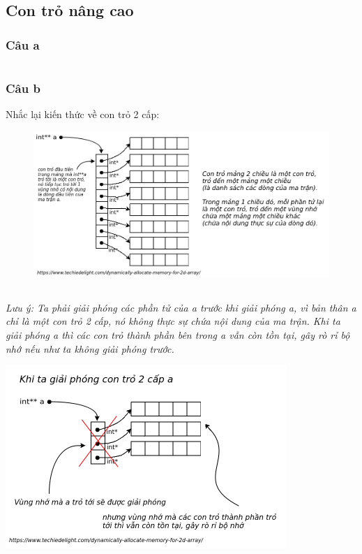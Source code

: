 \documentclass[main.tex]{subfiles}
\begin{document}

\subsection{Con trỏ nâng cao}
\subsubsection{Câu a}
\inputminted[linenos]{cpp}{answer_sources/ConTroNC_a.cpp}

\subsubsection{Câu b}
Nhắc lại kiến thức về con trỏ 2 cấp:\\
\begin{figure}
\includegraphics[width=1\textwidth]{image/ans_CTRLNC_1.png}
\end{figure}

\inputminted[linenos]{cpp}{answer_sources/ConTroNC_b.cpp}
\textit{Lưu ý: Ta phải giải phóng các phần tử của a trước khi giải phóng a, vì bản thân a chỉ là một con trỏ 2 cấp, nó không thực sự chứa nội dung của ma trận. Khi ta giải phóng a thì các con trỏ thành phần bên trong a vẫn còn tồn tại, gây rò rỉ bộ nhớ nếu như ta không giải phóng trước.}

\begin{center}
\includegraphics[width=0.8\textwidth]{image/ans_CTRLNC_2.png}
\end{center}
\end{document}
